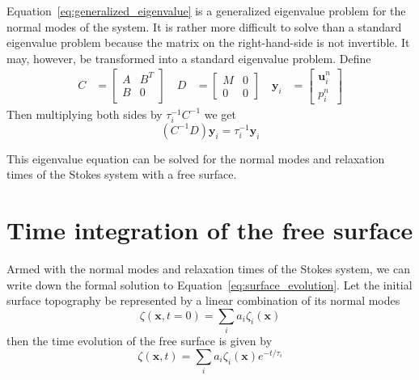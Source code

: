 \documentclass[preprint,12pt,authoryear]{elsarticle}
\begin{document}
Equation~\eqref{eq:generalized_eigenvalue} is a generalized eigenvalue problem for the normal modes of the system.
It is rather more difficult to solve than a standard eigenvalue problem because the matrix on the right-hand-side 
is not invertible. It may, however, be transformed into a standard eigenvalue problem.
Define
\begin{equation}
\begin{aligned}
C &= 
\begin{bmatrix}
A & B^T \\
B & 0 \\
\end{bmatrix} \quad
D &= 
\begin{bmatrix}
M & 0 \\
0 & 0
\end{bmatrix} \quad
\mathbf{y}_i &= 
\begin{bmatrix}
\mathbf{u}^n_i \\
p^n_i
\end{bmatrix} 
\end{aligned}
\end{equation}
Then multiplying both sides by $\tau_i^{-1}C^{-1}$ we get
\begin{equation}
(C^{-1}D)\mathbf{y}_i = \tau_i^{-1} \mathbf{y}_i
\label{eq:standard_eigenvalue}
\end{equation}

This eigenvalue equation can be solved for the normal modes and relaxation times of the Stokes system with 
a free surface.

\section{Time integration of the free surface}
\label{sec:timestepping}

Armed with the normal modes and relaxation times of the Stokes system, we can write down the
formal solution to Equation~\ref{eq:surface_evolution}. Let the initial surface topography be 
represented by a linear combination of its normal modes
\begin{equation}
\zeta(\mathbf{x}, t=0) = \displaystyle \sum_i a_i \zeta_i(\mathbf{x})
\end{equation}
then the time evolution of the free surface is given by
\begin{equation}
\zeta( \mathbf{x}, t) = \displaystyle \sum_i a_i \zeta_i(\mathbf{x}) e^{-t/\tau_i}
\end{equation}
\end{document}
